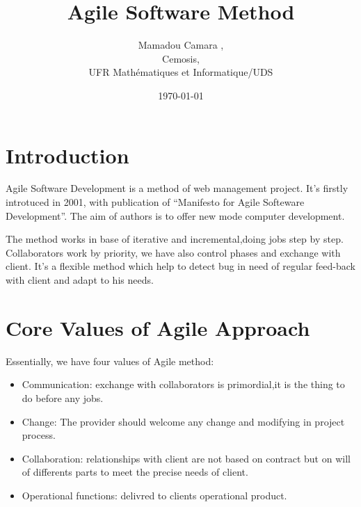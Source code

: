 \documentclass[12pt]{article}
\title{Agile Software Method}
\author{ 
  Mamadou Camara ,\\
  Cemosis,\\
  UFR Mathématiques et Informatique/UDS}
\date{\today}
\begin{document}
        \maketitle
        \tableofcontents
\newpage
\section{Introduction}
Agile Software Development is a method of web management project.
It's firstly introtuced in 2001, with publication of ``Manifesto for Agile Softeware Development''.
The aim of authors is to offer new mode computer development.

The method works in base of iterative and incremental,doing jobs step by step.
Collaborators work by priority, we have also control phases and exchange with client. 
It's a flexible method which help to detect bug in need of regular feed-back with client and adapt to his needs.
\section{Core Values of Agile Approach}
 Essentially, we have four values of Agile method:
\begin{itemize}
\item Communication: exchange with collaborators is primordial,it is the thing to do before any jobs.
\item Change: The provider should welcome any change and modifying in project process.
\item Collaboration: relationships  with client are not based on contract but on will of differents parts to meet the precise needs of client.
\item Operational functions: delivred to clients operational product.
\end{itemize}
\end{document}
